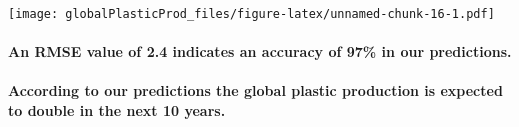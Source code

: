 \documentclass[
]{article}
\begin{document}
\texttt{[image: globalPlasticProd\_files/figure-latex/unnamed-chunk-16-1.pdf]}

\hypertarget{an-rmse-value-of-2.4-indicates-an-accuracy-of-97-in-our-predictions.}{%
\paragraph{An RMSE value of 2.4 indicates an accuracy of 97\% in our
predictions.}\label{an-rmse-value-of-2.4-indicates-an-accuracy-of-97-in-our-predictions.}}

\hypertarget{according-to-our-predictions-the-global-plastic-production-is-expected-to-double-in-the-next-10-years.}{%
\paragraph{According to our predictions the global plastic production is
expected to double in the next 10
years.}\label{according-to-our-predictions-the-global-plastic-production-is-expected-to-double-in-the-next-10-years.}}
\end{document}
